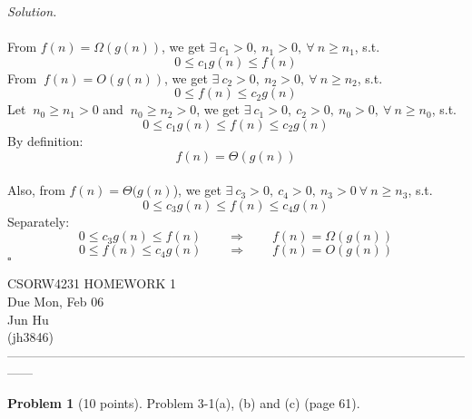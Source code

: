 \documentclass[11pt]{article}
\theoremstyle{definition}
\newtheorem{problem}{Problem}
\newenvironment{solution}{\noindent\emph{Solution.}}{\hfill$\square$}
\begin{document}
\begin{solution}
\\ \\
From $f(n) = \Omega(g(n))$, we get $\exists \ c_1 > 0, \ n_1 > 0, \ \forall \ n \geq n_1$,  s.t.
$$0 \leq c_1g(n) \leq f(n) $$
From $\  f(n) = O(g(n))$, we get $\exists \ c_2 > 0, \ n_2 > 0, \ \forall \ n \geq n_2$, s.t.
$$0 \leq f(n) \leq c_2g(n) $$
Let $\ n_0 \geq n_1 > 0$ and $ \ n_0 \geq n_2 > 0$, we get $\exists \ c_1 > 0, \ c_2 > 0, \ n_0  > 0 , \ \forall \ n \geq n_0$, s.t.
$$0 \leq c_1g(n) \leq f(n) \leq c_2g(n)$$
By definition:
$$f(n) = \Theta(g(n))$$
\\
Also, from $f(n) = \Theta(g(n)$), we get
$\exists \ c_3 > 0, \ c_4 > 0, \  n_3 > 0 \ \forall \ n \geq n_3$, s.t.
$$0 \leq c_3g(n) \leq f(n) \leq c_4g(n)$$
Separately:
$$
0 \leq c_3g(n) \leq f(n) \qquad \Rightarrow \qquad  f(n) = \Omega(g(n))
$$
$$
0 \leq f(n) \leq c_4g(n) \qquad \Rightarrow \qquad f(n)=O(g(n))
$$
\end{solution}

\newpage
\begin{center}
\Large{} 
CSORW4231 HOMEWORK 1 \\
\normalsize{}
Due Mon, Feb 06 \\
\large{Jun Hu \\
(jh3846)} \\ 
------------------------------------------------------------------------------------------------------------------
\end{center}


\begin{problem}[10 points]
Problem 3-1(a), (b) and (c) (page 61).
\end{problem}
\end{document}

